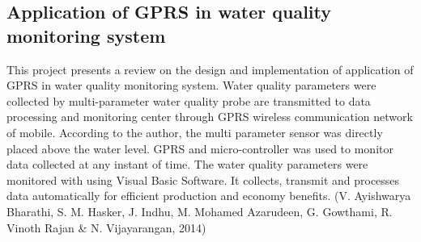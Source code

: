 \documentclass[12pt]{article}
\begin{document}
				\subsection*{Application of GPRS in water quality monitoring system}
					This project presents a review on the design and implementation of application of GPRS in water quality monitoring system. Water quality parameters were collected by multi-parameter water quality probe are transmitted to data processing and monitoring center through GPRS wireless communication network of mobile. According to the author, the multi parameter sensor was directly placed above the water level. GPRS and micro-controller was used to monitor data collected at any instant of time. The water quality parameters were monitored with using Visual Basic Software. It collects, transmit and processes data automatically for efficient production and economy benefits. (V. Ayishwarya Bharathi, S. M. Hasker, J. Indhu, M. Mohamed Azarudeen, G. Gowthami, R. Vinoth Rajan \& N. Vijayarangan, 2014)
			
			
\end{document}
